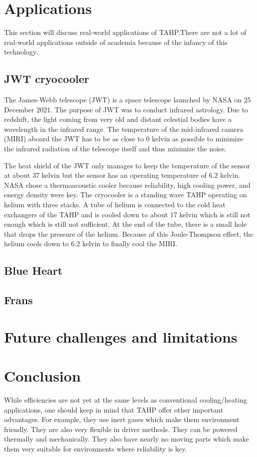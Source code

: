 \documentclass{article}
\newcommand{\newpara}
    {
      \bigbreak{}
      \noindent
    }
\begin{document}
\section{Applications}
This section will discuss real-world applications of TAHP.\@ There are not a lot of real-world applications outside of academia because of the infancy of this technology.
\subsection{JWT cryocooler\cite{Petach2014MidII,Moore_2017,ross2022conceptual}}
The James-Webb telescope (JWT) is a space telescope launched by NASA on 25 December 2021. The purpose of JWT was to conduct infrared astrology. Due to redshift, the light coming from very old and distant celestial bodies have a wavelength in the infrared range. The temperature of the mid-infrared camera (MIRI) aboard the JWT has to be as close to 0 kelvin as possible to minimize the infrared radiation of the telescope itself and thus minimize the noise.
\newpara{}
The heat shield of the JWT only manages to keep the temperature of the sensor at about 37 kelvin but the sensor has an operating temperature of 6.2 kelvin. NASA chose a thermoacoustic cooler because reliability, high cooling power, and energy density were key. The cryocooler is a standing wave TAHP operating on helium with three stacks. A tube of helium is connected to the cold heat exchangers of the TAHP and is cooled down to about 17 kelvin which is still not enough which is still not sufficient. At the end of the tube, there is a small hole that drops the pressure of the helium. Because of this Joule-Thompson effect, the helium cools down to 6.2 kelvin to finally cool the MIRI.
\newpara{}

\subsection{Blue Heart}
\subsection{Frans}
\section{Future challenges and limitations}

\section{Conclusion}
While efficiencies are not yet at the same levels as conventional cooling/heating applications, one should keep in mind that TAHP offer other important advantages. For example, they use inert gases which make them environment friendly. They are also very flexible in driver methods. They can be powered thermally and mechanically. They also have nearly no moving parts which make them very suitable for environments where reliability is key.
\newpage


\end{document}
